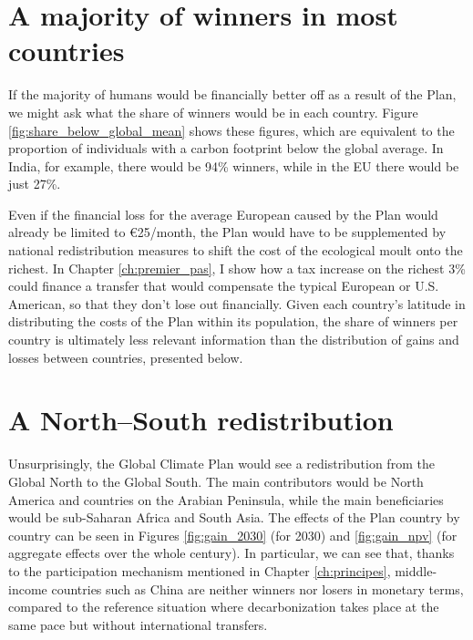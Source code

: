 \documentclass[a5paper,english,openany]{memoir}
\begin{document}
\section{A majority of winners in most countries}

If the majority of humans would be financially better off as a result of the Plan, we might ask what the share of winners would be in each country. Figure \ref{fig:share_below_global_mean} shows these figures, which are equivalent to the proportion of individuals with a carbon footprint below the global average. In India, for example, there would be 94\% winners, while in the EU there would be just 27\%.  

Even if the financial loss for the average European caused by the Plan would already be limited to \euro{}25/month, the Plan would have to be supplemented by national redistribution measures to shift the cost of the ecological moult onto the richest. In Chapter \ref{ch:premier_pas}, I show how a tax increase on the richest %
3\% could finance a transfer that would compensate the typical European or U.S. American, so that they don't lose out financially. Given each country's latitude in distributing the costs of the Plan within its population, the share of winners per country is ultimately less relevant information than the distribution of gains and losses between countries, presented below.


\section{A North--South redistribution}

Unsurprisingly, the Global Climate Plan would see a redistribution from the Global North to the Global South. The main contributors would be North America and countries on the Arabian Peninsula, while the main beneficiaries would be sub-Saharan Africa and South Asia. The effects of the Plan country by country can be seen in Figures \ref{fig:gain_2030} (for 2030) and \ref{fig:gain_npv} (for aggregate effects over the whole century). In particular, we can see that, thanks to the participation mechanism mentioned in Chapter \ref{ch:principes}, middle-income countries such as China are neither winners nor losers in monetary terms, compared to the reference situation where decarbonization takes place at the same pace but without international transfers. 
\end{document}

